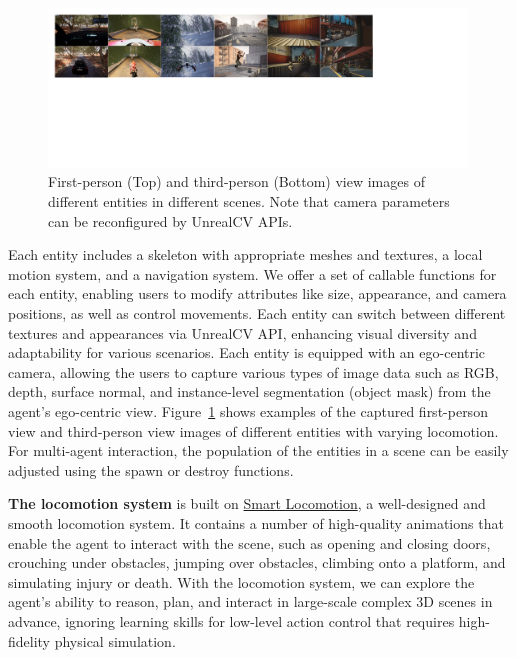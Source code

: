 \documentclass{article}
\begin{document}
\begin{figure}[b]
    \centering
    \includegraphics[width=0.99\textwidth]{image/body.pdf} 
    \caption{First-person (Top) and third-person (Bottom) view images of different entities in different scenes. Note that camera parameters can be reconfigured by UnrealCV APIs.}
    \label{fig:body}
\end{figure}

Each entity includes a skeleton with appropriate meshes and textures, a local motion system, and a navigation system.
We offer a set of callable functions for each entity, enabling users to modify attributes like size, appearance, and camera positions, as well as control movements. 
Each entity can switch between different textures and appearances via UnrealCV API, enhancing visual diversity and adaptability for various scenarios. 
Each entity is equipped with an ego-centric camera, allowing the users to capture various types of image data such as RGB, depth, surface normal, and instance-level segmentation (object mask) from the agent's ego-centric view. Figure~\ref{fig:body} shows examples of the captured first-person view and third-person view images of different entities with varying locomotion.
For multi-agent interaction, the population of the entities in a scene can be easily adjusted using the spawn or destroy functions. 

\textbf{The locomotion system} is built on \href{https://www.unrealengine.com/marketplace/en-US/product/smart-locomotion}{Smart Locomotion}, a well-designed and smooth locomotion system.
It contains a number of high-quality animations that enable the agent to interact with the scene, such as opening and closing doors, crouching under obstacles, jumping over obstacles, climbing onto a platform, and simulating injury or death. With the locomotion system, we can explore the agent's ability to reason, plan, and interact in large-scale complex 3D scenes in advance, ignoring learning skills for low-level action control that requires high-fidelity physical simulation.
\end{document}
